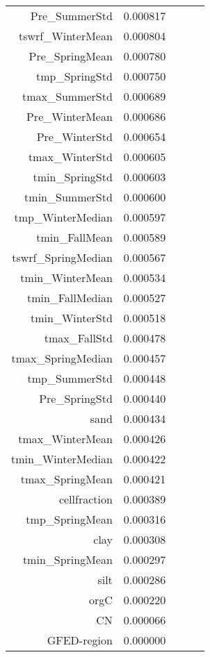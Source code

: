 \begin{tabular}{rrrrr}
Pre_SummerStd & 0.000817 \\
tswrf_WinterMean & 0.000804 \\
Pre_SpringMean & 0.000780 \\
tmp_SpringStd & 0.000750 \\
tmax_SummerStd & 0.000689 \\
Pre_WinterMean & 0.000686 \\
Pre_WinterStd & 0.000654 \\
tmax_WinterStd & 0.000605 \\
tmin_SpringStd & 0.000603 \\
tmin_SummerStd & 0.000600 \\
tmp_WinterMedian & 0.000597 \\
tmin_FallMean & 0.000589 \\
tswrf_SpringMedian & 0.000567 \\
tmin_WinterMean & 0.000534 \\
tmin_FallMedian & 0.000527 \\
tmin_WinterStd & 0.000518 \\
tmax_FallStd & 0.000478 \\
tmax_SpringMedian & 0.000457 \\
tmp_SummerStd & 0.000448 \\
Pre_SpringStd & 0.000440 \\
sand & 0.000434 \\
tmax_WinterMean & 0.000426 \\
tmin_WinterMedian & 0.000422 \\
tmax_SpringMean & 0.000421 \\
cellfraction & 0.000389 \\
tmp_SpringMean & 0.000316 \\
clay & 0.000308 \\
tmin_SpringMean & 0.000297 \\
silt & 0.000286 \\
orgC & 0.000220 \\
CN & 0.000066 \\
GFED-region & 0.000000 \\
\bottomrule
\end{tabular}
